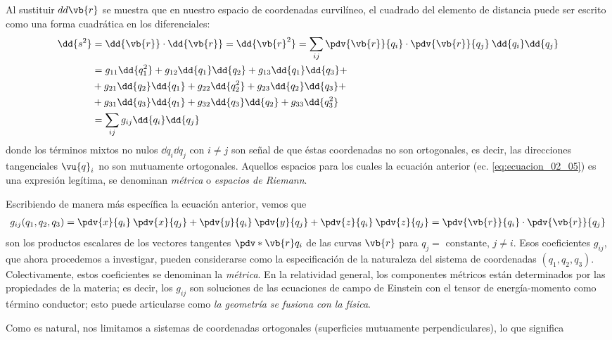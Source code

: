 Al sustituir $dd\vb{r}$ se muestra que en nuestro espacio de coordenadas curvilíneo, el cuadrado del elemento de distancia puede ser escrito como una forma cuadrática en los diferenciales:
\begin{align}
\dd{s^{2}} &= \dd{\vb{r}} \cdot \dd{\vb{r}} =  \dd{\vb{r}^{2}} =  \sum_{ij} \pdv{\vb{r}}{q_{i}} \cdot \pdv{\vb{r}}{q_{j}} \: \dd{q_{i}} \dd{q_{j}} \nonumber \\
&= g_{11} \dd{q_{1}^{2}} + g_{12} \dd{q_{1}} \dd{q_{2}} + g_{13} \dd{q_{1}} \dd{q_{3}} + \nonumber \\
&+ g_{21} \dd{q_{2}} \dd{q_{1}} + g_{22} \dd{q_{2}^{2}} + g_{23} \dd{q_{2}} \dd{q_{3}} + \nonumber \\
&+ g_{31} \dd{q_{3}} \dd{q_{1}} + g_{32} \dd{q_{3}} \dd{q_{2}} + g_{33} \dd{q_{3}^{2}} \nonumber \\
&= \sum_{ij} g_{ij} \dd{q_{i}} \dd{q_{j}}
\label{eq:ecuacion_02_05}
\end{align}
donde los términos mixtos no nulos $\dd{q_{i}} \dd{q_{j}}$ con $i \neq j$ son señal de que éstas coordenadas no son ortogonales, es decir, las direcciones tangenciales $\vu{q}_{i}$ no son mutuamente ortogonales. Aquellos espacios para los cuales la ecuación anterior (ec. \ref{eq:ecuacion_02_05}) es una expresión legítima, se denominan \emph{métrica} o \emph{espacios de Riemann}.
\par
Escribiendo de manera más específica la ecuación anterior, vemos que
\begin{align}
g_{ij}(q_{1}, q_{2}, q_{3}) = \pdv{x}{q_{i}} \: \pdv{x}{q_{j}} + \pdv{y}{q_{i}} \: \pdv{y}{q_{j}} + \pdv{z}{q_{i}} \: \pdv{z}{q_{j}} = \pdv{\vb{r}}{q_{i}} \cdot \pdv{\vb{r}}{q_{j}}
\label{eq:ecuacion_02_06}
\end{align}
son los productos escalares de los vectores tangentes $\pdv*{\vb{r}}{q_{i}}$ de las curvas $\vb{r}$ para $q_{j} = \mbox{ constante}$, $j \neq i$. Esos coeficientes $g_{ij}$, que ahora procedemos a investigar, pueden considerarse como la especificación de la naturaleza del sistema de coordenadas $(q_{1}, q_{2}, q_{3})$. Colectivamente, estos coeficientes se denominan la \emph{métrica}. En la relatividad general, los componentes métricos están determinados por las propiedades de la materia; es decir, los $g_{ij}$ son soluciones de las ecuaciones de campo de Einstein con el tensor de energía-momento como término conductor; esto puede articularse como \emph{la geometría se fusiona con la física}.
\par
Como es natural, nos limitamos a  sistemas de coordenadas ortogonales (superficies mutuamente perpendiculares), lo que significa
